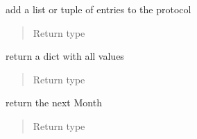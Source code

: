 \documentclass[letterpaper,10pt,english]{sphinxmanual}
\begin{document}
\begin{fulllineitems}
\begin{fulllineitems}
\end{fulllineitems}


\begin{fulllineitems}
\label{\detokenize{devmanual:protocol.Month.append_protocol}}
add a list or tuple of entries to the protocol
\begin{quote}\begin{description}
\item[{Return type}] \leavevmode
{\hyperref[\detokenize{devmanual:protocol.Month}]{}}

\end{description}\end{quote}

\end{fulllineitems}


\begin{fulllineitems}
\label{\detokenize{devmanual:protocol.Month.dump}}
return a dict with all values
\begin{quote}\begin{description}
\item[{Return type}] \leavevmode
{}

\end{description}\end{quote}

\end{fulllineitems}


\begin{fulllineitems}
\label{\detokenize{devmanual:protocol.Month.get_next}}
return the next Month
\begin{quote}\begin{description}
\item[{Return type}] \leavevmode
{\hyperref[\detokenize{devmanual:protocol.Month}]{}}

\end{description}\end{quote}

\end{fulllineitems}


\end{fulllineitems}
\end{document}
